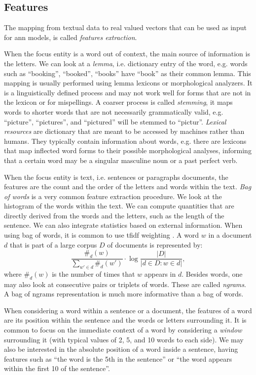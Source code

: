 \subsection{Features}
The mapping from textual data to real valued vectors that can be used
as input for \ac{ann} models, is called \emph{features extraction}.

When the focus entity is a word out of context, the main source
of information is the letters. We can look at a \emph{lemma},
i.e. dictionary entry of the word, e.g. words such as ``booking'',
``booked'', ``books'' have ``book'' as their common lemma. This mapping is
usually performed using lemma lexicons or morphological analyzers. It
is a linguistically defined process and may not work well for forms
that are not in the lexicon or for mispellings. A coarser process is
called \emph{stemming}, it maps words to shorter words that are
not necessarily grammatically valid, e.g. ``picture'', ``pictures'',
and ``pictured'' will be stemmed to ``pictur''. \emph{Lexical
  resources} are dictionary that are meant to be accessed by machines
rather than humans. They typically contain information about words,
e.g. there are lexicons that map inflected word forms to their
possible morphological analyses, informing that a certain word may be a
singular masculine noun or a past perfect verb.

When the focus entity is text, i.e. sentences or paragraphs documents,
the features are the count and the order of the letters and words
within the text. \emph{Bag of words} is a very common feature
extraction procedure. We look at the histogram of the words within the
text. We can compute quantities that are directly derived from
the words and the letters, such as the length of the sentence. We can
also integrate statistics based on external information. When using
bag of words, it is common to use \ac{tfidf} weighting
\cite{manning_introduction_2008}. A word $w$ in a document $d$ that is
part of a large corpus $D$ of documents is represented by:
\begin{equation*}
  \frac{\#_d(w)}{\sum_{w'\in d}\#_d(w')}\cdot\log\frac{|D|}{|d\in
    D:w\in d|},
\end{equation*}
where $\#_d(w)$ is the number of times that $w$ appears in
$d$. Besides words, one may also look at consecutive pairs or triplets
of words. These are called \emph{ngrams}. A bag of ngrams
representation is much more informative than a bag of words.

When considering a word within a sentence or a document, the features
of a word are its position within the sentence and the words or
letters surrounding it. It is common to focus on the immediate context
of a word by considering a \emph{window} surrounding it (with typical
values of 2, 5, and 10 words to each side). We may also be interested
in the absolute position of a word inside a sentence, having features
such as ``the word is the 5th in the sentence'' or ``the word appears
within the first 10 of the sentence''.

